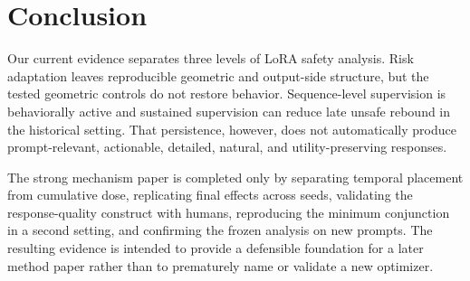 \section{Conclusion}

Our current evidence separates three levels of LoRA safety analysis. Risk adaptation leaves reproducible geometric and output-side structure, but the tested geometric controls do not restore behavior. Sequence-level supervision is behaviorally active and sustained supervision can reduce late unsafe rebound in the historical setting. That persistence, however, does not automatically produce prompt-relevant, actionable, detailed, natural, and utility-preserving responses.

The strong mechanism paper is completed only by separating temporal placement from cumulative dose, replicating final effects across seeds, validating the response-quality construct with humans, reproducing the minimum conjunction in a second setting, and confirming the frozen analysis on new prompts.  The resulting evidence is intended to provide a defensible foundation for a later method paper rather than to prematurely name or validate a new optimizer.
